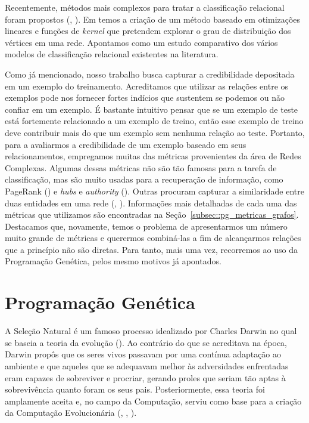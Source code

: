 Recentemente, métodos mais complexos para tratar a classificação relacional foram propostos (\cite{Zhang08}, \cite{Lu03}).
Em \cite{Zhang08} temos a criação de um método baseado em otimizações lineares e funções de \textit{kernel} que pretendem explorar o grau de distribuição dos vértices em uma rede. Apontamos \cite{Lu03} como um estudo comparativo dos vários modelos de classificação relacional existentes na literatura.

Como já mencionado, nosso trabalho busca capturar a credibilidade depositada em um exemplo do treinamento. Acreditamos que utilizar as relações entre os exemplos pode nos fornecer fortes indícios que sustentem se podemos ou não confiar em um exemplo. É bastante intuitivo pensar que se um exemplo de teste está fortemente relacionado a um exemplo de treino, então esse exemplo de treino deve contribuir mais do que um exemplo sem nenhuma relação ao teste.
Portanto, para a avaliarmos a credibilidade de um exemplo baseado em seus relacionamentos, empregamos muitas das métricas provenientes da área de Redes Complexas. 
Algumas dessas métricas não são tão famosas para a tarefa de classificação, mas são muito usadas para a recuperação de informação, como PageRank (\cite{Page98}) e \textit{hubs} e \textit{authority} (\cite{Kleinberg99}). Outras procuram capturar a similaridade entre duas entidades em uma rede (\cite{Jaccard01}, \cite{Adamic03}).
Informações mais detalhadas de cada uma das métricas que utilizamos são encontradas na Seção~\ref{subsec::pg_metricas_grafos}.
Destacamos que, novamente, temos o problema de apresentarmos um número muito grande de métricas e querermos combiná-las a fim de alcançarmos relações que a princípio não são diretas.
Para tanto, mais uma vez, recorremos ao uso da Programação Genética, pelos mesmo motivos já apontados.


\section{Programação Genética}
\label{sec::pg}

A Seleção Natural é um famoso processo idealizado por Charles Darwin no qual se baseia a teoria da evolução (\cite{Darwin1859}). Ao contrário do que se acreditava na época, Darwin propôs que os seres vivos passavam por uma contínua adaptação ao ambiente e que aqueles que se adequavam melhor às adversidades enfrentadas eram capazes de sobreviver e procriar, gerando proles que seriam tão aptas à sobrevivência quanto foram os seus pais. 
Posteriormente, essa teoria foi amplamente aceita e, no campo da Computação, serviu como base para a criação da Computação Evolucionária (\cite{Barricelli55}, \cite{Rechenberg73}, \cite{Goldberg89}).

